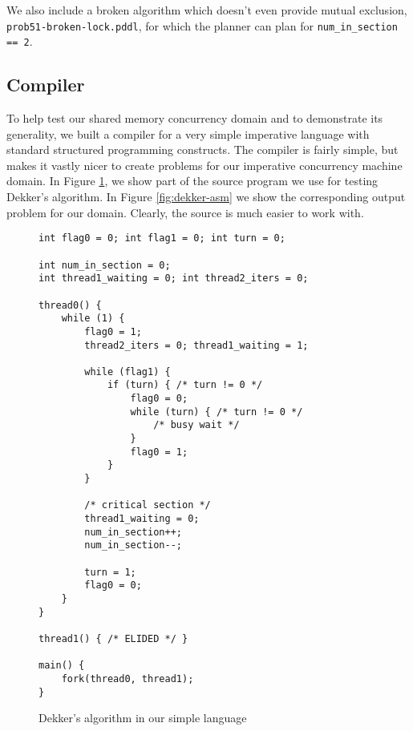 We also include a broken algorithm which doesn't even provide mutual exclusion, \texttt{prob51-broken-lock.pddl}, for which the planner can plan for \texttt{num\_in\_section == 2}.

\subsection{Compiler}

To help test our shared memory concurrency domain and to demonstrate
its generality, we built a compiler for a very simple imperative
language with standard structured programming constructs. The compiler
is fairly simple, but makes it vastly nicer to create problems for our
imperative concurrency machine domain. In Figure
\ref{fig:dekker-code}, we show part of the source program we use for
testing Dekker's algorithm. In Figure \ref{fig:dekker-asm} we show the
corresponding output problem for our domain. Clearly, the source is
much easier to work with.



\begin{figure}
\begin{center}
\begin{verbatim}
int flag0 = 0; int flag1 = 0; int turn = 0;

int num_in_section = 0;
int thread1_waiting = 0; int thread2_iters = 0;

thread0() {
    while (1) {
        flag0 = 1;
        thread2_iters = 0; thread1_waiting = 1;

        while (flag1) {
            if (turn) { /* turn != 0 */
                flag0 = 0;
                while (turn) { /* turn != 0 */
                    /* busy wait */
                }
                flag0 = 1;
            }
        }

        /* critical section */
        thread1_waiting = 0;
        num_in_section++;
        num_in_section--;

        turn = 1;
        flag0 = 0;
    }
}

thread1() { /* ELIDED */ }

main() {
    fork(thread0, thread1);
}
\end{verbatim}
\end{center}
\caption{Dekker's algorithm in our simple language}
\label{fig:dekker-code}
\end{figure}

